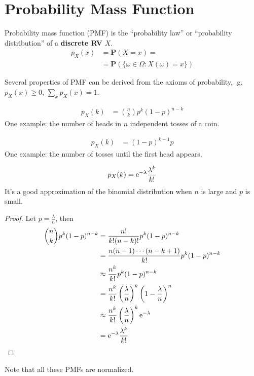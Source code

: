 \section{Probability Mass Function}
\begin{definition}
    Probability mass function (PMF) is the ``probability law'' or ``probability distribution'' of a \textbf{discrete RV} $X$.
    \begin{align}
        p_{X}(x) &= \mathbf{P}(X = x) = \\ 
                 &= \mathbf{P}(\{\omega \in \varOmega: X(\omega) = x\})
    \end{align}
\end{definition}
Several properties of PMF can be derived from the axioms of probability, \e.g. $p_{X}(x) \geq 0$, $\sum_{x} p_{X}(x) = 1$.
\begin{example}
    \begin{align}
        p_{X}(k) &= \binom{n}{k} p^{k} (1-p)^{n-k}
    \end{align}
    One example: the number of heads in $n$ independent tosses of a coin.
\end{example}
\begin{example}
    \begin{align}
        p_{X}(k) &= (1-p)^{k-1} p
    \end{align}
    One example: the number of tosses until the first head appears.
\end{example}
\begin{example}
    \begin{align}
        p_{X}(k) = \mathrm{e}^{-\lambda} \frac{\lambda^{k}}{k!}
    \end{align}
    It's a good approximation of the binomial distribution when $n$ is large and $p$ is small.
    \begin{proof}
        Let $p = \frac{\lambda}{n}$, then
        \begin{equation}
        \begin{aligned}
            \binom{n}{k} p^{k} (1-p)^{n-k} &= \frac{n!}{k!(n-k)!} p^{k} (1-p)^{n-k} \\
            &= \frac{n(n-1)\cdots(n-k+1)}{k!} p^{k} (1-p)^{n-k} \\
            &\approx \frac{n^{k}}{k!} p^{k} (1-p)^{n-k} \\
            &= \frac{n^{k}}{k!} \left(\frac{\lambda}{n}\right)^{k} \left(1-\frac{\lambda}{n}\right)^{n} \\
            &\approx \frac{n^{k}}{k!} \left(\frac{\lambda}{n}\right)^{k} \mathrm{e}^{-\lambda} \\
            &= \mathrm{e}^{-\lambda} \frac{\lambda^{k}}{k!}
        \end{aligned}
        \end{equation}
    \end{proof}
\end{example}
Note that all these PMFs are normalized.

